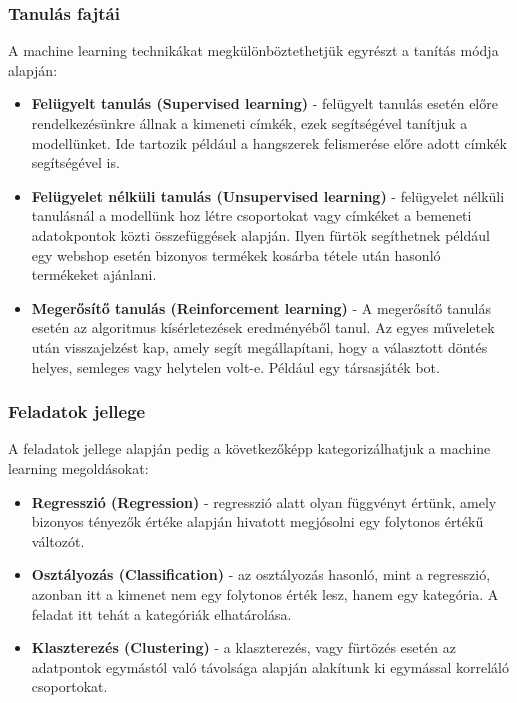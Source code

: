\subsubsection{Tanulás fajtái}

A machine learning technikákat megkülönböztethetjük egyrészt a tanítás módja alapján:
\begin{itemize}
\item \textbf{Felügyelt tanulás (Supervised learning)} - felügyelt tanulás esetén előre rendelkezésünkre állnak a kimeneti címkék, ezek segítségével tanítjuk a modellünket. Ide tartozik például a hangszerek felismerése előre adott címkék segítségével is.
\item \textbf{Felügyelet nélküli tanulás (Unsupervised learning)} - felügyelet nélküli tanulásnál a modellünk hoz létre csoportokat vagy címkéket a bemeneti adatokpontok közti összefüggések alapján. Ilyen fürtök segíthetnek például egy webshop esetén bizonyos termékek kosárba tétele után hasonló termékeket ajánlani.
\item\textbf{Megerősítő tanulás (Reinforcement learning)} - A megerősítő tanulás esetén az algoritmus kísérletezések eredményéből tanul. Az egyes műveletek után visszajelzést kap, amely segít megállapítani, hogy a választott döntés helyes, semleges vagy helytelen volt-e. Például egy társasjáték bot. \cite{azure}
\end{itemize}


\subsubsection{Feladatok jellege}

A feladatok jellege alapján pedig a következőképp kategorizálhatjuk a machine learning megoldásokat:

\begin{itemize}
\item \textbf{Regresszió (Regression)} - regresszió alatt olyan függvényt értünk, amely bizonyos tényezők értéke alapján hivatott megjósolni egy folytonos értékű változót. 
\item \textbf{Osztályozás (Classification)} - az osztályozás hasonló, mint a regresszió, azonban itt a kimenet nem egy folytonos érték lesz, hanem egy kategória. A feladat itt tehát a kategóriák elhatárolása.
\item \textbf{Klaszterezés (Clustering)} - a klaszterezés, vagy fürtözés esetén az adatpontok egymástól való távolsága alapján alakítunk ki egymással korreláló csoportokat. \cite{deeplearningbook}
\end{itemize}


